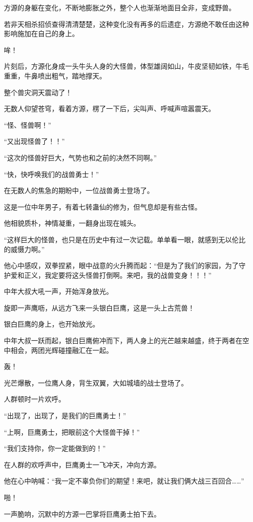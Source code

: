 \begin{this_body}
方源的身躯在变化，不断地膨胀之外，整个人也渐渐地面目全非，变成野兽。

若非天相杀招侦查得清清楚楚，这种变化没有再多的后遗症，方源绝不敢任由这种影响施加在自己的身上。

哞！

片刻后，方源化身成一头牛头人身的大怪兽，体型雄阔如山，牛皮坚韧如铁，牛毛重重，牛鼻喷出粗气，踏地撑天。

整个兽灾洞天震动了！

无数人仰望苍穹，看着方源，楞了一下后，尖叫声、呼喊声喧嚣震天。

“怪、怪兽啊！”

“又出现怪兽了！！”

“这次的怪兽好巨大，气势也和之前的决然不同啊。”

“快，快呼唤我们的战兽勇士！”

在无数人的焦急的期盼中，一位战兽勇士登场了。

这是一位中年男子，有着七转蛊仙的修为，但气息却是有些古怪。

他相貌质朴，神情凝重，一翻身出现在城头。

“这样巨大的怪兽，也只是在历史中有过一次记载。单单看一眼，就感到无以伦比的威慑力啊。”

他心中感叹，双拳捏紧，眼中战意的火升腾而起：“但是为了我们的家园，为了守护爱和正义，我定要将这头怪兽打倒啊。来吧，我的战兽变身！！！”

中年大叔大吼一声，开始浑身放光。

旋即一声鹰呖，从远方飞来一头银白巨鹰，这是一头上古荒兽！

银白巨鹰的身上，也开始放光。

中年大叔一跃而起，银白巨鹰俯冲而下，两人身上的光芒越来越盛，终于两者在空中相会，两团光辉碰撞融汇在一起。

轰！

光芒爆散，一位鹰人身，背生双翼，大如城墙的战士登场了。

人群顿时一片欢呼。

“出现了，出现了，是我们的巨鹰勇士！”

“上啊，巨鹰勇士，把眼前这个大怪兽干掉！”

“我们支持你，你一定能做到的！”

在人群的欢呼声中，巨鹰勇士一飞冲天，冲向方源。

他在心中呐喊：“我一定不辜负你们的期望！来吧，就让我们俩大战三百回合……”

啪！

一声脆响，沉默中的方源一巴掌将巨鹰勇士拍下去。


\end{this_body}
